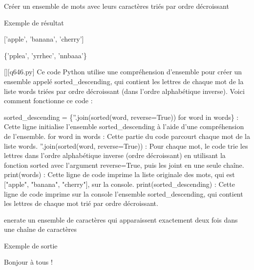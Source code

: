         \question
        Créer un ensemble de mots avec leurs caractères triés par ordre décroissant

Exemple de résultat

['apple', 'banana', 'cherry']

\{'pplea', 'yrrhec', 'nnbaaa'\}
        \par
        \begin{solution}
            \renewcommand{\nomfichier}{q646.py}
            \pythonfile{\chemincode \nomfichier}[][\nomfichier]
            Ce code Python utilise une compréhension d'ensemble pour créer un ensemble appelé sorted\_descending, qui contient les lettres de chaque mot de la liste words triées par ordre décroissant (dans l'ordre alphabétique inverse). Voici comment fonctionne ce code :

    sorted\_descending = \{''.join(sorted(word, reverse=True)) for word in words\} : Cette ligne initialise l'ensemble sorted\_descending à l'aide d'une compréhension de l'ensemble.
        for word in words : Cette partie du code parcourt chaque mot de la liste words.
        ''.join(sorted(word, reverse=True)) : Pour chaque mot, le code trie les lettres dans l'ordre alphabétique inverse (ordre décroissant) en utilisant la fonction sorted avec l'argument reverse=True, puis les joint en une seule chaîne.
    print(words) : Cette ligne de code imprime la liste originale des mots, qui est ["apple", "banana", "cherry"], sur la console.
    print(sorted\_descending) : Cette ligne de code imprime sur la console l'ensemble sorted\_descending, qui contient les lettres de chaque mot trié par ordre décroissant.
        \end{solution}
        

        \question
        enerate un ensemble de caractères qui apparaissent exactement deux fois dans une chaîne de caractères

Exemple de sortie

Bonjour à tous !

